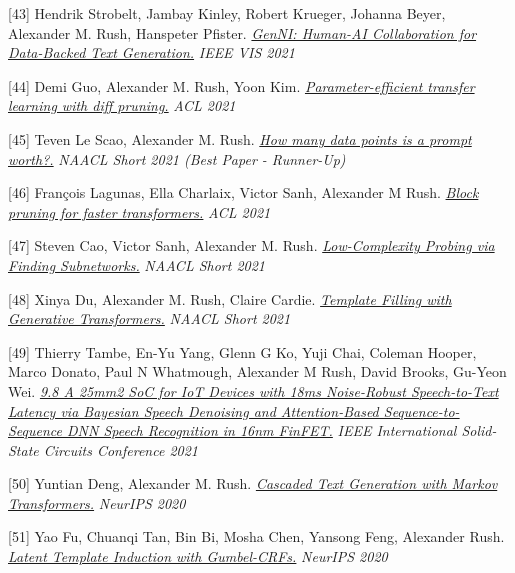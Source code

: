 \documentclass[10pt]{article}
\begin{document}
\medskip


[43] \ind Hendrik Strobelt, Jambay Kinley, Robert Krueger, Johanna Beyer, Alexander M. Rush, Hanspeter Pfister. \emph{\href{ None }{ GenNI: Human-AI Collaboration for Data-Backed Text Generation.} }\emph{ IEEE VIS 2021 }

\medskip


[44] \ind Demi Guo, Alexander M. Rush, Yoon Kim. \emph{\href{ https://arxiv.org/pdf/2012.07463.pdf }{ Parameter-efficient transfer learning with diff pruning.} }\emph{ ACL 2021 }

\medskip


[45] \ind Teven Le Scao, Alexander M. Rush. \emph{\href{ https://aclanthology.org/2021.naacl-main.208.pdf }{ How many data points is a prompt worth?.} }\emph{ NAACL Short 2021 (Best Paper - Runner-Up) }

\medskip


[46] \ind François Lagunas, Ella Charlaix, Victor Sanh, Alexander M Rush. \emph{\href{ https://arxiv.org/pdf/2109.04838 }{ Block pruning for faster transformers.} }\emph{ ACL 2021 }

\medskip


[47] \ind Steven Cao, Victor Sanh, Alexander M. Rush. \emph{\href{ https://aclanthology.org/2021.naacl-main.74/ }{ Low-Complexity Probing via Finding Subnetworks.} }\emph{ NAACL Short 2021 }

\medskip


[48] \ind Xinya Du, Alexander M. Rush, Claire Cardie. \emph{\href{ https://aclanthology.org/2021.naacl-main.70/ }{ Template Filling with Generative Transformers.} }\emph{ NAACL Short 2021 }

\medskip


[49] \ind Thierry Tambe, En-Yu Yang, Glenn G Ko, Yuji Chai, Coleman Hooper, Marco Donato, Paul N Whatmough, Alexander M Rush, David Brooks, Gu-Yeon Wei. \emph{\href{ https://ieeexplore.ieee.org/abstract/document/9366062 }{ 9.8 A 25mm2 SoC for IoT Devices with 18ms Noise-Robust Speech-to-Text Latency via Bayesian Speech Denoising and Attention-Based Sequence-to-Sequence DNN Speech Recognition in 16nm FinFET.} }\emph{ IEEE International Solid-State Circuits Conference 2021 }

\medskip


[50] \ind Yuntian Deng, Alexander M. Rush. \emph{\href{ https://arxiv.org/pdf/2006.01112 }{ Cascaded Text Generation with Markov Transformers.} }\emph{ NeurIPS 2020 }

\medskip


[51] \ind Yao Fu, Chuanqi Tan, Bin Bi, Mosha Chen, Yansong Feng, Alexander Rush. \emph{\href{ https://github.com/FranxYao/Gumbel-CRF }{ Latent Template Induction with Gumbel-CRFs.} }\emph{ NeurIPS 2020 }
\end{document}
